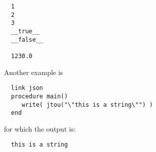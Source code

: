 \documentclass[letterpaper,12pt]{article}
\begin{document}
\begin{description}
  \begin{verbatim}
  1
  2
  3
  __true__
  __false__

  1230.0
  \end{verbatim}


Another example is 

  \begin{verbatim}
  link json
  procedure main()
     write( jtou("\"this is a string\"") )
  end
  \end{verbatim}

for which the output is:

  \begin{verbatim}
  this is a string
  \end{verbatim}

\end{description}
\end{document}
